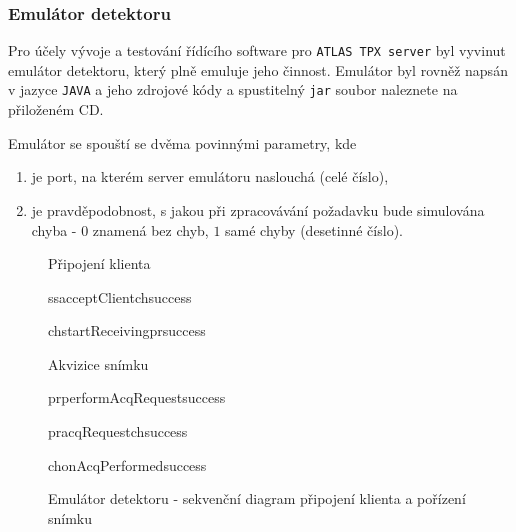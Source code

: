 \subsubsection{Emulátor detektoru}
Pro účely vývoje a testování řídícího software pro \texttt{ATLAS TPX server} byl vyvinut emulátor detektoru, který plně emuluje jeho činnost. Emulátor byl rovněž napsán v jazyce \texttt{JAVA} a jeho zdrojové kódy a spustitelný \texttt{jar} soubor naleznete na přiloženém CD.

Emulátor se spouští se dvěma povinnými parametry, kde
\begin{enumerate}
	\item je port, na kterém server emulátoru naslouchá (celé číslo),
	\item je pravděpodobnost, s jakou při zpracovávání požadavku bude simulována chyba - $0$ znamená bez chyb, $1$ samé chyby (desetinné číslo).
\end{enumerate}

\begin{figure}[t]
	\begin{center}
		\begin{sequencediagram}
			\begin{sdblock}{Připojení klienta}{}
				\begin{call}{ss}{acceptClient}{ch}{success}
					\begin{call}{ch}{startReceiving}{pr}{success}
					\end{call}
				\end{call}
			\end{sdblock}
			\begin{sdblock}{Akvizice snímku}{}
				\begin{callself}{pr}{performAcqRequest}{success}
					\begin{call}{pr}{acqRequest}{ch}{success}
					\end{call}	
				\end{callself}	
				\postlevel
				\begin{callself}{ch}{onAcqPerformed}{success}
				\end{callself}	
			\end{sdblock}			
		\end{sequencediagram}
		\caption{Emulátor detektoru - sekvenční diagram připojení klienta a pořízení snímku}
		\label{fig:uml:emulator}
	\end{center}
\end{figure}

